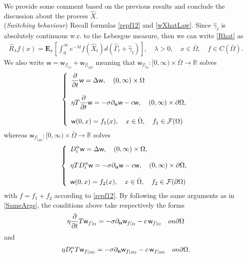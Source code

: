 \documentclass[11pt,a4paper]{article}
\begin{document}
We provide some comment based on the previous results and conclude the discussion about the process $\hat{X}$.\\


({\it Switching behaviour}) Recall formulas \eqref{repf12} and \eqref{wXhatLaw}. Since $\hat{\gamma}_t$ is absolutely continuous w.r. to the Lebesgue measure, then we can write \eqref{Rhat} as
\begin{align*}
\hat{R}_\lambda f(x) = \mathbf{E}_x\left[\int_0^\infty e^{-\lambda t} f(\hat{X}_t) d(\hat{\Gamma}_t + \hat{\gamma}_t) \right], \quad \lambda>0, \quad x \in \bar{\Omega}, \quad f \in C(\bar{\Omega}).
\end{align*}
We also write $\mathsf{w}= \mathsf{w}_{f|_\Omega} + \mathsf{w}_{f|_{\partial \Omega}}$ meaning that $\mathsf{w}_{f|_\Omega}: [0, \infty)\times \bar{\Omega} \to \mathbb{R}$ solves
\begin{equation}
\label{probInterior}
\left\lbrace
\begin{array}{ll}
\displaystyle \frac{\partial}{\partial t} \mathsf{w} = \Delta \mathsf{w}, \quad (0, \infty) \times \Omega\\
\\
\displaystyle \eta T \frac{\partial}{\partial t} \mathsf{w} = - \sigma \partial_{\bf n} \mathsf{w} - c \mathsf{w},  \quad (0, \infty) \times \partial \Omega,\\
\\
\displaystyle \mathsf{w} (0,x)= f_1(x), \quad x \in \bar{\Omega}, \quad f_1 \in \mathcal{F}(\Omega)
\end{array}
\right. 
\end{equation}
whereas $\mathsf{w}_{f|_{\partial \Omega}} : [0, \infty)\times \bar{\Omega} \to \mathbb{R}$ solves
\begin{equation}
\label{probBoundary}
\left\lbrace
\begin{array}{ll}
\displaystyle D^\alpha_t \mathsf{w} = \Delta \mathsf{w},  \quad (0, \infty) \times \Omega,\\
\\
\displaystyle \eta T D^\alpha_t \mathsf{w} = - \sigma \partial_{\bf n} \mathsf{w} - c \mathsf{w},  \quad (0, \infty) \times \partial \Omega,\\
\\
\displaystyle \mathsf{w} (0,x)= f_2(x), \quad x \in \bar{\Omega}, \quad f_2 \in \mathcal{F}(\partial \Omega)
\end{array}
\right.
\end{equation}
with $f=f_1 + f_2$ according to \eqref{repf12}. By following the same arguments as in \eqref{SameArgs}, the conditions above take respectively the forms
\begin{align*}
\eta \frac{\partial}{\partial t} T \mathsf{w}_{f|_{\Omega}} = -\sigma \partial_{\bf n} \mathsf{w}_{f|_{\Omega}} - c \, \mathsf{w}_{f|_{\Omega}} \quad \textrm{on } \partial \Omega 
\end{align*}
and
\begin{align*}
\eta D^\alpha_t T \mathsf{w}_{f|_{\partial\Omega}} = -\sigma \partial_{\bf n} \mathsf{w}_{f|_{\partial\Omega}} - c \, \mathsf{w}_{f|_{\partial\Omega}} \quad \textrm{on } \partial \Omega.
\end{align*}
\end{document}
